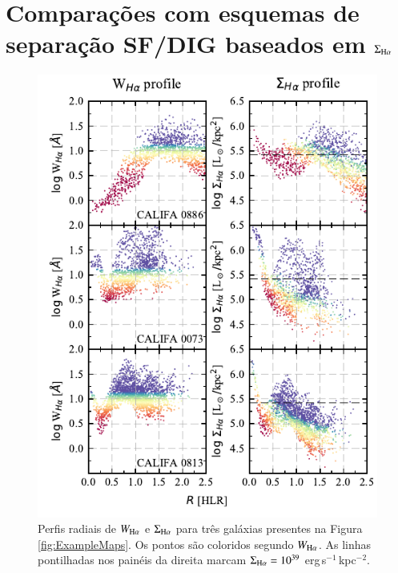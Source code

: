 \section{Comparações com esquemas de separação SF/DIG baseados em $\Sigma_{{\rm H}\alpha}$}
\label{sec:DIGdisc:compSBHa}

\begin{figure}
 \includegraphics[scale=1.7]{figuras/fig_WHaSBHa_profile_faceon_paper.pdf}
 \caption[Perfis radiais de $W_{{\rm H}\alpha}$ e $\Sigma_{{\rm H}\alpha}$]
 {Perfis radiais de $W_{{\rm H}\alpha}$ e $\Sigma_{{\rm H}\alpha}$ para três galáxias presentes na Figura \ref{fig:ExampleMaps}. Os pontos são coloridos segundo $W_{\Ha}$. As linhas pontilhadas nos painéis da direita marcam $\Sigma_{\Ha} = 10^{39}$ erg$\,$s$^{-1}\,$kpc$^{-2}$.}
 \label{fig:WHa_and_SHa_profiles}
\end{figure}

